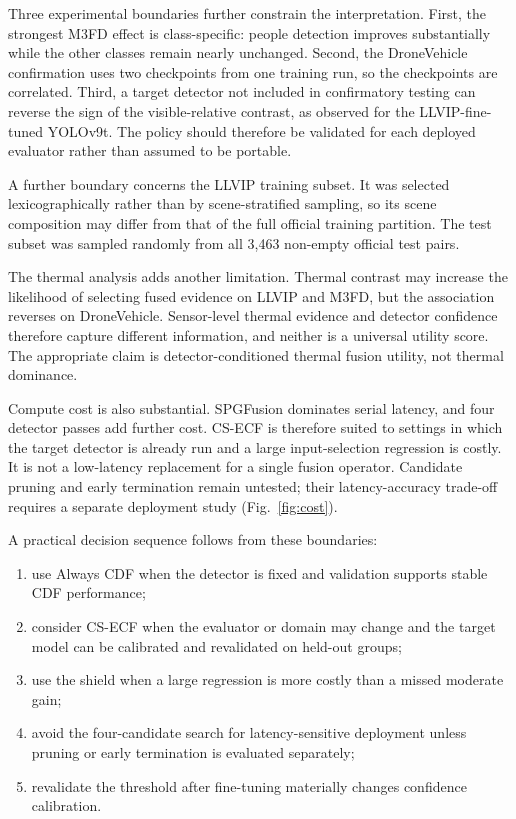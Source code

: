 \documentclass[preprint,11pt]{elsarticle}
\begin{document}
Three experimental boundaries further constrain the interpretation. First, the
strongest M3FD effect is class-specific: people detection improves substantially
while the other classes remain nearly unchanged. Second, the DroneVehicle
confirmation uses two checkpoints from one training run, so the checkpoints are
correlated. Third, a target detector not included in confirmatory testing can reverse
the sign of the visible-relative contrast, as observed for the
LLVIP-fine-tuned YOLOv9t. The policy should therefore be validated for each
deployed evaluator rather than assumed to be portable.

A further boundary concerns the LLVIP training subset. It was selected
lexicographically rather than by scene-stratified sampling, so its scene
composition may differ from that of the full official training partition. The
test subset was sampled randomly from all 3,463 non-empty official test pairs.

The thermal analysis adds another limitation. Thermal contrast may increase the
likelihood of selecting fused evidence on LLVIP and M3FD, but the association
reverses on DroneVehicle. Sensor-level thermal evidence and detector confidence
therefore capture different information, and neither is a universal utility
score. The appropriate claim is detector-conditioned thermal fusion utility,
not thermal dominance.

Compute cost is also substantial. SPGFusion dominates serial latency, and four
detector passes add further cost. CS-ECF is therefore suited to settings in
which the target detector is already run and a large input-selection regression
is costly. It is not a low-latency replacement for a single fusion operator.
Candidate pruning and early termination remain untested; their latency-accuracy
trade-off requires a separate deployment study (Fig.~\ref{fig:cost}).

A practical decision sequence follows from these boundaries:
\begin{enumerate}
  \item use Always CDF when the detector is fixed and validation supports stable
  CDF performance;
  \item consider CS-ECF when the evaluator or domain may change and the target
  model can be calibrated and revalidated on held-out groups;
  \item use the shield when a large regression is more costly than a missed
  moderate gain;
  \item avoid the four-candidate search for latency-sensitive deployment unless
  pruning or early termination is evaluated separately;
  \item revalidate the threshold after fine-tuning materially changes confidence
  calibration.
\end{enumerate}
\end{document}
